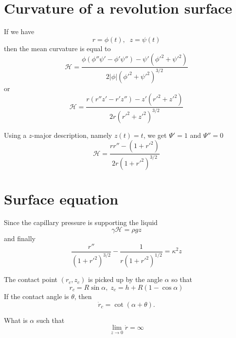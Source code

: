 \documentclass[aps,onecolumn]{revtex4}
\begin{document}
\section{Curvature of a revolution surface}

If we have
\begin{equation}
	r = \phi(t),\;\; z = \psi(t)
\end{equation}
then the mean curvature is equal to
\begin{equation}
	\mathcal{H} =  
	\dfrac{\phi\left(\phi''\psi'-\phi'\psi''\right) - \psi'\left({\phi'}^2+{\psi'}^2\right)}
	{2\vert\phi\vert\left({\phi'}^2+{\psi'}^2\right)^{3/2}}
\end{equation}
or
\begin{equation}
	\mathcal{H} =  \dfrac{
		r \left(r''z'-r'z''\right)  - z' \left(r'^2+z'^2\right)
	}
	{
		2r\left(r'^2+z'^2\right)^{3/2}
	}
\end{equation}

Using a $z$-major description, namely $z(t)=t$, we get $\Psi'=1$ and $\Psi''=0$
\begin{equation}
	\mathcal{H} =  \dfrac{r r'' - \left(1+{r'}^2\right)}{2r\left(1+{r'}^2\right)^{3/2}}
\end{equation}

\section{Surface equation}
Since the capillary pressure is supporting the liquid
\begin{equation}
	\gamma \mathcal{H} = \rho g z
\end{equation}
and finally
\begin{equation}
	\dfrac{r''}{\left(1+{r'}^2\right)^{3/2}} - \dfrac{1}{r\left(1+{r'}^2\right)^{1/2}} = \kappa^2 z 
\end{equation}

The contact point $(r_c,z_c)$ is picked up by the angle $\alpha$ so that
\begin{equation}
	r_c = R\sin\alpha,\;z_c = h+R\left(1-\cos\alpha\right)
\end{equation}
If the contact angle is $\theta$, then
\begin{equation}
	\dot{r}_c = \cot\left(\alpha+\theta\right).
\end{equation}

What is $\alpha$ such that
\begin{equation}
	\lim_{z\to0}\dot{r} = \infty
\end{equation}
\end{document}
